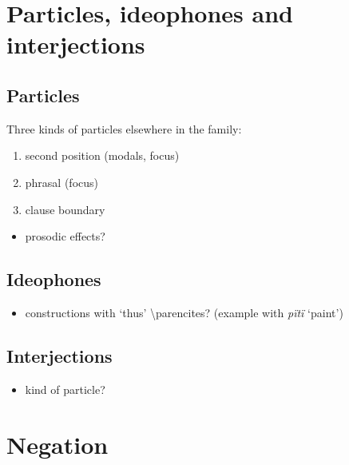 \documentclass{memoir}
\begin{document}
\chapter{\texorpdfstring{Particles, ideophones and interjections
\label{partideo}}{Particles, ideophones and interjections }}

\section{Particles}

Three kinds of particles elsewhere in the family:

\begin{enumerate}
\def\labelenumi{\arabic{enumi}.}
\tightlist
\item
  second position (modals, focus)
\item
  phrasal (focus)
\item
  clause boundary
\end{enumerate}

\begin{itemize}
\tightlist
\item
  prosodic effects?
\end{itemize}

\section{Ideophones}

\begin{itemize}
\tightlist
\item
  constructions with  `thus' \textbackslash parencites?
  (example with \emph{pïtï} `paint')
\end{itemize}

\section{Interjections}

\begin{itemize}
\tightlist
\item
  kind of particle?
\end{itemize}

\chapter{\texorpdfstring{Negation \label{negation}}{Negation }}
\end{document}
